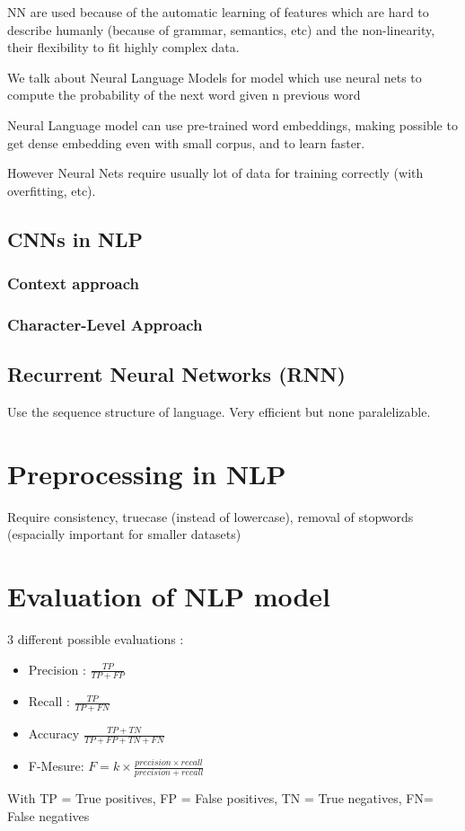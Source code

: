 			NN are used because of the automatic learning of features which are hard to describe humanly (because of grammar, semantics, etc) and the non-linearity, their flexibility to fit highly complex data. 

			We talk about Neural Language Models for model which use neural nets to compute the probability of the next word given n previous word

			Neural Language model can use pre-trained word embeddings, making possible to get dense embedding even with small corpus, and to learn faster.

			However Neural Nets require usually lot of data for training correctly (with overfitting, etc). 


		\subsection{CNNs in NLP}

			\subsubsection{Context approach}

			\subsubsection*{Character-Level Approach}

		\subsection{Recurrent Neural Networks (RNN)}
			
			Use the sequence structure of language. Very efficient but none paralelizable. 

	\section{Preprocessing in NLP}

			Require consistency, truecase (instead of lowercase), removal of stopwords (espacially important for smaller datasets)

	\section{Evaluation of NLP model}
			3 different possible evaluations :
			\begin{itemize}
				\item Precision : $\frac{TP}{TP+FP}$
				\item Recall : $\frac{TP}{TP+FN}$
				\item Accuracy $\frac{TP+TN}{TP+FP+TN+FN}$
				\item F-Mesure: $F = k \times \frac{precision \times recall}{precision + recall}$
			\end{itemize}
			With TP = True positives, FP = False positives, TN = True negatives, FN= False negatives

